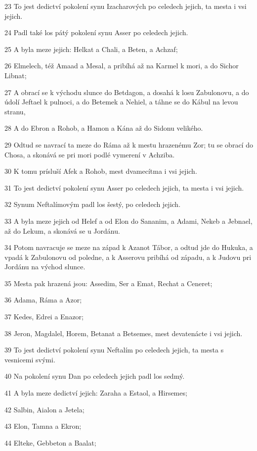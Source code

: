 \par 23 To jest dedictví pokolení synu Izacharových po celedech jejich, ta mesta i vsi jejich.
\par 24 Padl také los pátý pokolení synu Asser po celedech jejich.
\par 25 A byla meze jejich: Helkat a Chali, a Beten, a Achzaf;
\par 26 Elmelech, též Amaad a Mesal, a pribíhá až na Karmel k mori, a do Sichor Libnat;
\par 27 A obrací se k východu slunce do Betdagon, a dosahá k losu Zabulonovu, a do údolí Jeftael k pulnoci, a do Betemek a Nehiel, a táhne se do Kábul na levou stranu,
\par 28 A do Ebron a Rohob, a Hamon a Kána až do Sidonu velikého.
\par 29 Odtud se navrací ta meze do Ráma až k mestu hrazenému Zor; tu se obrací do Chosa, a skonává se pri mori podlé vymerení v Achziba.
\par 30 K tomu prísluší Afek a Rohob, mest dvamecítma i vsi jejich.
\par 31 To jest dedictví pokolení synu Asser po celedech jejich, ta mesta i vsi jejich.
\par 32 Synum Neftalímovým padl los šestý, po celedech jejich.
\par 33 A byla meze jejich od Helef a od Elon do Sananim, a Adami, Nekeb a Jebnael, až do Lekum, a skonává se u Jordánu.
\par 34 Potom navracuje se meze na západ k Azanot Tábor, a odtud jde do Hukuka, a vpadá k  Zabulonovu od poledne, a k Asserovu pribíhá od západu, a k Judovu pri Jordánu na východ slunce.
\par 35 Mesta pak hrazená jsou: Assedim, Ser a Emat, Rechat a Ceneret;
\par 36 Adama, Ráma a Azor;
\par 37 Kedes, Edrei a Enazor;
\par 38 Jeron, Magdalel, Horem, Betanat a Betsemes, mest devatenácte i vsi jejich.
\par 39 To jest dedictví pokolení synu Neftalím po celedech jejich, ta mesta s vesnicemi svými.
\par 40 Na pokolení synu Dan po celedech jejich padl los sedmý.
\par 41 A byla meze dedictví jejich: Zaraha a Estaol, a Hirsemes;
\par 42 Salbin, Aialon a Jetela;
\par 43 Elon, Tamna a Ekron;
\par 44 Elteke, Gebbeton a Baalat;
